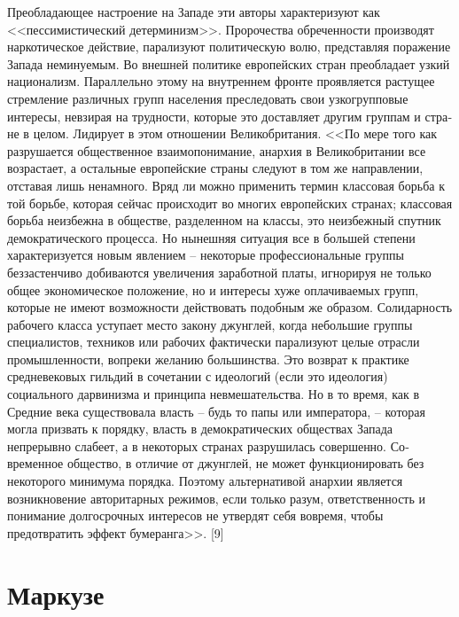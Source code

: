 \documentclass{book}
\begin{document}
{Преобладающее настроение на Западе эти авторы характе­ризуют как <<пессимистический детерминизм>>. Пророчества обреченности производят наркотическое действие, парализуют политическую волю, представляя поражение Запада немину­емым. Во внешней политике европейских стран преобладает узкий национализм. Параллельно этому на внутреннем фрон­те проявляется растущее стремление различных групп населе­ния преследовать свои узкогрупповые интересы, невзирая на трудности, которые это доставляет другим группам и стра­не в целом. Лидирует в этом отношении Великобритания. <<По мере того как разрушается общественное взаимопонимание, анархия в Великобритании все возрастает, а остальные евро­пейские страны следуют в том же направлении, отставая лишь ненамного. Вряд ли можно применить термин классовая борьба к  той борьбе, которая сейчас происходит во многих евро­пейских странах; классовая борьба неизбежна в обществе, раз­деленном на классы, это неизбежный спутник демократиче­ского процесса. Но нынешняя ситуация все в большей степени характеризуется новым явлением -- некоторые професси­ональные группы беззастенчиво добиваются увеличения зара­ботной платы, игнорируя не только общее экономическое положение, но и интересы хуже оплачиваемых групп, которые не имеют возможности действовать подобным же образом. Солидарность рабочего класса уступает место закону джунг­лей, когда небольшие группы специалистов, техников или ра­бочих фактически парализуют целые отрасли промышленно­сти, вопреки желанию большинства. Это возврат к практике средневековых гильдий в сочетании с идеологий (если это идеология) социального дарвинизма и принципа невмешатель­ства. Но в то время, как в Средние века существовала власть -- будь то папы или императора, -- которая могла призвать к поряд­ку, власть в демократических обществах Запада непрерывно слабеет, а в некоторых странах разрушилась совершенно. Со­временное общество, в отличие от джунглей, не может функ­ционировать без некоторого минимума порядка. Поэтому альтернативой анархии является возникновение авторитарных режимов, если только разум, ответственность и понимание долгосрочных интересов не утвердят себя вовремя, чтобы предотвратить эффект бумеранга>>. [9]

\section{Маркузе}

}
\end{document}
